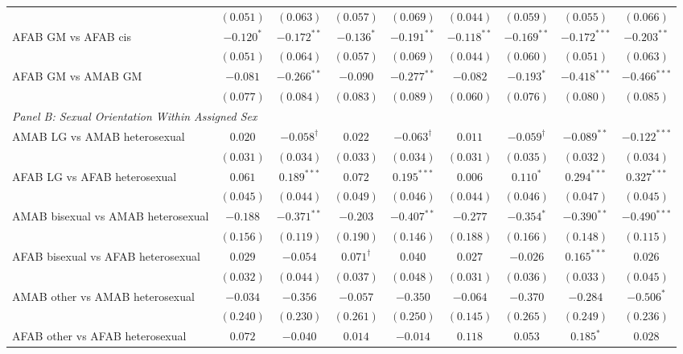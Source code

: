 \begin{table}[htpb]
{\begin{tabular}{l c c c c c c c c}
 & $(0.051)$ & $(0.063)$ & $(0.057)$ & $(0.069)$ & $(0.044)$ & $(0.059)$ & $(0.055)$ & $(0.066)$ \\
AFAB GM vs AFAB cis & $-0.120^{*}$ & $-0.172^{**}$ & $-0.136^{*}$ & $-0.191^{**}$ & $-0.118^{**}$ & $-0.169^{**}$ & $-0.172^{***}$ & $-0.203^{**}$ \\
 & $(0.051)$ & $(0.064)$ & $(0.057)$ & $(0.069)$ & $(0.044)$ & $(0.060)$ & $(0.051)$ & $(0.063)$ \\
AFAB GM vs AMAB GM & $-0.081$ & $-0.266^{**}$ & $-0.090$ & $-0.277^{**}$ & $-0.082$ & $-0.193^{*}$ & $-0.418^{***}$ & $-0.466^{***}$ \\
 & $(0.077)$ & $(0.084)$ & $(0.083)$ & $(0.089)$ & $(0.060)$ & $(0.076)$ & $(0.080)$ & $(0.085)$ \\
\hline
\multicolumn{9}{l}{\textit{Panel B: Sexual Orientation Within Assigned Sex}} \\ 
AMAB LG vs AMAB heterosexual & $0.020$ & $-0.058^{\dagger}$ & $0.022$ & $-0.063^{\dagger}$ & $0.011$ & $-0.059^{\dagger}$ & $-0.089^{**}$ & $-0.122^{***}$ \\
 & $(0.031)$ & $(0.034)$ & $(0.033)$ & $(0.034)$ & $(0.031)$ & $(0.035)$ & $(0.032)$ & $(0.034)$ \\
AFAB LG vs AFAB heterosexual & $0.061$ & $0.189^{***}$ & $0.072$ & $0.195^{***}$ & $0.006$ & $0.110^{*}$ & $0.294^{***}$ & $0.327^{***}$ \\
 & $(0.045)$ & $(0.044)$ & $(0.049)$ & $(0.046)$ & $(0.044)$ & $(0.046)$ & $(0.047)$ & $(0.045)$ \\
AMAB bisexual vs AMAB heterosexual & $-0.188$ & $-0.371^{**}$ & $-0.203$ & $-0.407^{**}$ & $-0.277$ & $-0.354^{*}$ & $-0.390^{**}$ & $-0.490^{***}$ \\
 & $(0.156)$ & $(0.119)$ & $(0.190)$ & $(0.146)$ & $(0.188)$ & $(0.166)$ & $(0.148)$ & $(0.115)$ \\
AFAB bisexual vs AFAB heterosexual & $0.029$ & $-0.054$ & $0.071^{\dagger}$ & $0.040$ & $0.027$ & $-0.026$ & $0.165^{***}$ & $0.026$ \\
 & $(0.032)$ & $(0.044)$ & $(0.037)$ & $(0.048)$ & $(0.031)$ & $(0.036)$ & $(0.033)$ & $(0.045)$ \\
AMAB other vs AMAB heterosexual & $-0.034$ & $-0.356$ & $-0.057$ & $-0.350$ & $-0.064$ & $-0.370$ & $-0.284$ & $-0.506^{*}$ \\
 & $(0.240)$ & $(0.230)$ & $(0.261)$ & $(0.250)$ & $(0.145)$ & $(0.265)$ & $(0.249)$ & $(0.236)$ \\
AFAB other vs AFAB heterosexual & $0.072$ & $-0.040$ & $0.014$ & $-0.014$ & $0.118$ & $0.053$ & $0.185^{*}$ & $0.028$ \\

\end{tabular}}
\end{table}
